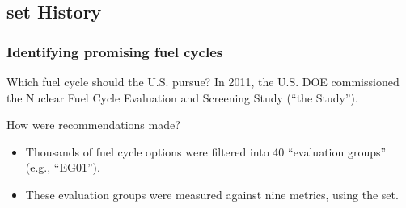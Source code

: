 \subsection{\gls{set} History}
\begin{frame}
    \frametitle{Identifying promising fuel cycles}
    \begin{block}{Which fuel cycle should the U.S. pursue?}
        In 2011, the U.S. \Gls{DOE} commissioned the Nuclear Fuel Cycle Evaluation and Screening Study (``the Study'').
    \end{block}
    \pause
    \begin{block}{How were recommendations made?}
        \begin{itemize}[<+->]
            \item Thousands of fuel cycle options were filtered into 40 ``evaluation groups'' (e.g., ``EG01'').
            \item These evaluation groups were measured against nine metrics, using the \gls{set}.
        \end{itemize}
    \end{block}
\end{frame}

